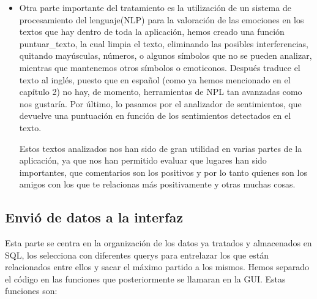 \begin{itemize}
	\item Otra parte importante del tratamiento es la utilización de un sistema de procesamiento del lenguaje(NLP) para la valoración de las emociones en los textos que hay dentro de toda la aplicación, hemos creado una función puntuar\_texto, la cual limpia el texto, eliminando las posibles interferencias, quitando mayúsculas, números, o algunos símbolos que no se pueden analizar, mientras que mantenemos otros símbolos o emoticonos. Después traduce el texto al inglés, puesto que en español (como ya hemos mencionado en el capítulo 2) no hay, de momento, herramientas de NPL tan avanzadas como nos gustaría. Por último, lo pasamos por el analizador de sentimientos, que devuelve una puntuación en función de los sentimientos detectados en el texto.
	
	Estos textos analizados nos han sido de gran utilidad en varias partes de la aplicación, ya que nos han permitido evaluar que lugares han sido importantes, que comentarios son los positivos y por lo tanto quienes son los amigos con los que te relacionas más positivamente y otras muchas cosas.

\end{itemize}

\subsection{Envió de datos a la interfaz}
Esta parte se centra en la organización de los datos ya tratados y almacenados en SQL, los selecciona con diferentes querys para entrelazar los que están relacionados entre ellos y sacar el máximo partido a los mismos. Hemos separado el código en las funciones que posteriormente se llamaran en la GUI. Estas funciones son:

